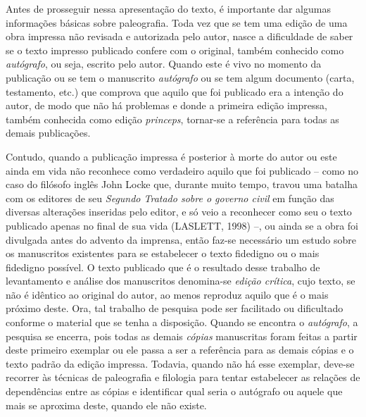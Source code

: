 Antes de prosseguir nessa apresentação do texto, é importante dar
algumas informações básicas sobre paleografia. Toda vez que se tem uma
edição de uma obra impressa não revisada e autorizada pelo autor, nasce
a dificuldade de saber se o texto impresso publicado confere com o
original, também conhecido como \emph{autógrafo}, ou seja, escrito pelo
autor. Quando este é vivo no momento da publicação ou se tem o
manuscrito \emph{autógrafo} ou se tem algum documento (carta,
testamento, etc.) que comprova que aquilo que foi publicado era a
intenção do autor, de modo que não há problemas e donde a primeira
edição impressa, também conhecida como edição \emph{princeps}, tornar-se
a referência para todas as demais publicações.

Contudo, quando a publicação impressa é posterior à morte do autor ou
este ainda em vida não reconhece como verdadeiro aquilo que foi
publicado -- como no caso do filósofo inglês John Locke que, durante
muito tempo, travou uma batalha com os editores de seu \emph{Segundo
Tratado sobre o governo civil} em função das diversas alterações
inseridas pelo editor, e só veio a reconhecer como seu o texto publicado
apenas no final de sua vida (LASLETT, 1998) --, ou ainda se a obra foi
divulgada antes do advento da imprensa, então faz-se necessário um
estudo sobre os manuscritos existentes para se estabelecer o texto
fidedigno ou o mais fidedigno possível. O texto publicado que é o
resultado desse trabalho de levantamento e análise dos manuscritos
denomina-se \emph{edição crítica}, cujo texto, se não é idêntico ao
original do autor, ao menos reproduz aquilo que é o mais próximo deste.
Ora, tal trabalho de pesquisa pode ser facilitado ou dificultado
conforme o material que se tenha a disposição. Quando se encontra o
\emph{autógrafo}, a pesquisa se encerra, pois todas as demais
\emph{cópias} manuscritas foram feitas a partir deste primeiro exemplar
ou ele passa a ser a referência para as demais cópias e o texto padrão
da edição impressa. Todavia, quando não há esse exemplar, deve-se
recorrer às técnicas de paleografia e filologia para tentar estabelecer
as relações de dependências entre as cópias e identificar qual seria o
autógrafo ou aquele que mais se aproxima deste, quando ele não existe.


